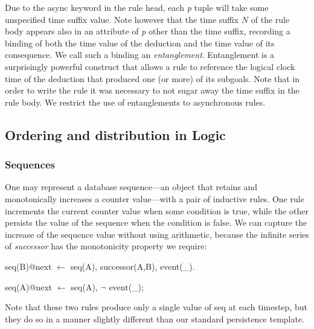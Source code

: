 Due to the async keyword in the rule head, each \emph{p} tuple will take some unspecified time suffix value.
Note however that the time suffix $N$ of the rule body appears also in an attribute of \emph{p} other than the time suffix, recording a 
binding of both the time value of the deduction and the time value of its consequence.  We call such a binding
an \emph{entanglement}.   Entanglement is a surprisingly powerful construct that allows a rule to 
reference the logical clock time of the deduction that produced one (or more) of its subgoals.  Note that in order
to write the rule it was necessary to not sugar away the time suffix in the rule body.  We restrict the use of entanglements to asynchronous rules. 


\subsection{Ordering and distribution in Logic}

\subsubsection{Sequences}
One may represent a database sequence---an object that retains and monotonically increases a counter value---with a pair of inductive rules.  One rule increments the current counter value when some condition is 
true, while the other persists the value of the sequence when the condition is false.  We can capture the increase
of the sequence value without using arithmetic, because the infinite series of \emph{successor} has the monotonicity
property we require:

\begin{Dedalus}
seq(B)@next \(\leftarrow\) seq(A), successor(A,B), event(_).
  
seq(A)@next \(\leftarrow\) seq(A), \(\lnot\) event(_);
\end{Dedalus}

Note that these two rules produce only a single value of seq at each timestep, but they do so in a manner slightly different than our standard persistence template.


